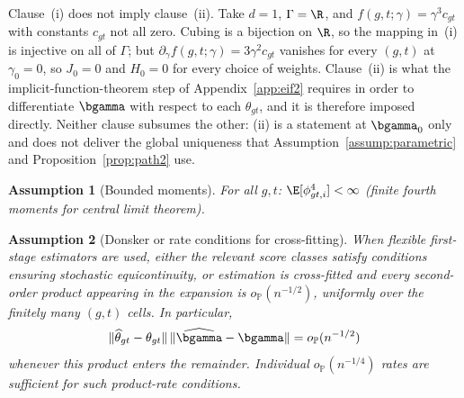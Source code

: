 \documentclass{article}
\newtheorem{assumption}{Assumption}
\renewcommand{\P}{\mathbb{P}}
\begin{document}
\begin{remark}\label{rem:rc5-independence}
Clause~(i) does not imply clause~(ii). Take $d=1$, $\Gamma = \R$, and $f(g,t;\gamma) = \gamma^{3} c_{gt}$ with constants $c_{gt}$ not all zero. Cubing is a bijection on $\R$, so the mapping in~(i) is injective on all of $\Gamma$; but $\partial_{\gamma} f(g,t;\gamma) = 3\gamma^{2} c_{gt}$ vanishes for every $(g,t)$ at $\gamma_0 = 0$, so $J_0 = 0$ and $H_0 = 0$ for every choice of weights. Clause~(ii) is what the implicit-function-theorem step of Appendix~\ref{app:eif2} requires in order to differentiate $\bgamma$ with respect to each $\theta_{gt}$, and it is therefore imposed directly. Neither clause subsumes the other: (ii) is a statement at $\bgamma_0$ only and does not deliver the global uniqueness that Assumption~\ref{assump:parametric} and Proposition~\ref{prop:path2} use.
\end{remark}

\begin{assumption}[Bounded moments]\label{RC6}
For all $g,t$: $\E[\phi_{gt,i}^4] < \infty$ (finite fourth moments for central limit theorem).
\end{assumption}

\begin{assumption}[Donsker or rate conditions for cross-fitting]\label{RC7}
When flexible first-stage estimators are used, either the relevant score classes satisfy conditions ensuring stochastic equicontinuity, or estimation is cross-fitted and every second-order product appearing in the expansion is $o_{\P}(n^{-1/2})$, uniformly over the finitely many $(g,t)$ cells. In particular,
\[
\|\widehat{\theta}_{gt}-\theta_{gt}\|
\,
\|\widehat{\bgamma}-\bgamma\|
=
o_{\P}(n^{-1/2})
\]
whenever this product enters the remainder. Individual $o_{\P}(n^{-1/4})$ rates are sufficient for such product-rate conditions.
\end{assumption}
\end{document}
